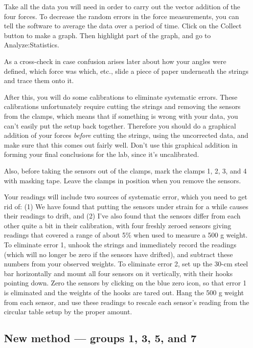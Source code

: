 Take all the data you will need in order to carry out the vector addition of the four forces.
To decrease the random errors in the force measurements, you can tell the software to average
the data over a period of time. Click on the Collect button to make a graph.
Then highlight part of the graph, and go to Analyze:Statistics.

As a cross-check in case confusion arises later about how your angles were defined, which
force was which, etc., slide a piece of paper underneath the strings and trace them onto it.

After this, you will do some calibrations to eliminate systematic errors. These calibrations
unfortunately require cutting the strings and removing the sensors from the clamps,
which means that if something is wrong with your
data, you can't easily put the setup back together. Therefore you should do a graphical
addition of your forces \emph{before} cutting the strings, using the uncorrected data,
and make sure that this comes out fairly well. Don't use this graphical addition in forming
your final conclusions for the lab, since it's uncalibrated.

Also, before taking the sensors out of the clamps,
mark the clamps 1, 2, 3, and 4 with masking tape. Leave the clamps in position when you remove the
sensors.

Your readings will include two sources of systematic error, which you need
to get rid of: (1) We have found that putting the
sensors under strain for a while causes their readings to drift, and (2)
I've also found that the sensors differ from each other quite a bit in their
calibration, with four freshly zeroed sensors giving readings
that covered a range of about 5\% when used to measure a 500 g weight.
To eliminate error 1, unhook the strings and immediately record the readings (which
will no longer be zero if the sensors have drifted), and subtract these
numbers from your observed weights. To eliminate error 2, set up the 30-cm steel bar
horizontally and mount all four sensors on it vertically, with their hooks pointing down.
Zero the sensors by clicking on the blue zero icon, so that error 1 is eliminated and the weights of the hooks are tared out.
Hang the 500 g weight from each sensor, and use these readings to
rescale each sensor's reading from the circular table setup by the proper amount.

\subsection*{New method --- groups 1, 3, 5, and 7}

